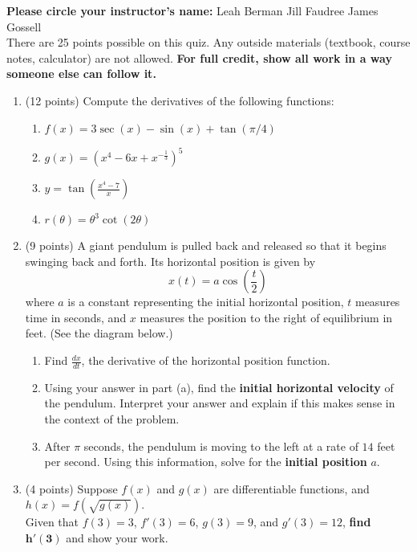 \documentclass[12pt]{article}
\renewcommand{\emph}[1]{\textsf{\textbf{#1}}}
\begin{document}
\emph{Please circle your instructor's name:} \hfill Leah Berman  \hfill   Jill Faudree \hfill James Gossell \\

There are 25 points possible on this quiz. Any outside materials (textbook, course notes, calculator) are not allowed.  \emph{For full credit, show all work in a way someone else can follow it.} 
\begin{enumerate}
\item (12 points) Compute the derivatives of the following functions:
	\begin{enumerate}
	\item $\displaystyle f(x) = 3\sec(x)-\sin(x)+\tan(\pi/4)$
	\vfill
	\item $\displaystyle g(x) = \left(x^4-6x+x^{-\frac{1}{3}}\right)^5$
	\vfill
	\item $\displaystyle y = \tan\left(\frac{x^4-7}{x}\right)$
	\vfill 
	\item $r(\theta) = \theta^3\cot(2\theta)$
	\vfill
	\end{enumerate}
\newpage
\item (9 points) A giant pendulum is pulled back and released so that it begins swinging back and forth. Its horizontal position is given by $$x(t)=a\cos\left(\frac{t}{2}\right)$$ where $a$ is a constant representing the initial horizontal position, $t$ measures time in seconds, and $x$ measures the position to the right of equilibrium in feet. (See the diagram below.)


	\begin{enumerate}
	\item Find $\displaystyle \frac{dx}{dt}$, the derivative of the horizontal position function.
	\vfill
	\item Using your answer in part (a), find the \textbf{initial horizontal velocity} of the pendulum. Interpret your answer and explain if this makes sense in the context of the problem.
	\vfill
	\item After $\pi$ seconds, the pendulum is moving to the left at a rate of $14$ feet per second. Using this information, solve for the \textbf{initial position} $a$.
	\vfill
	\end{enumerate}



\item (4 points) Suppose $f(x)$ and $g(x)$ are differentiable functions, and $\displaystyle h(x) = f\left(\sqrt{g(x)}\right)$.\\ Given that $f(3)=3$, $f'(3)=6$, $g(3)=9$, and $g'(3)=12$, \textbf{find} $\mathbf{h'(3)}$ and show your work.

\vfill
\vfill

\end{enumerate}
\end{document}
